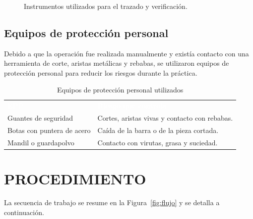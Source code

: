 \documentclass[12pt,a4paper]{article}
\newcommand{\encab}[1]{\textcolor{white}{\sffamily\bfseries #1}}
\begin{document}
\begin{figure}[H]
	\centering
	\caption{Instrumentos utilizados para el trazado y
		verificación.}\label{fig:instrumentos}
\end{figure}

\subsection{Equipos de protección personal}

Debido a que la operación fue realizada manualmente y existía contacto con una
herramienta de corte, aristas metálicas y rebabas, se utilizaron equipos de
protección personal para reducir los riesgos durante la práctica.

\begin{table}[H]
	\centering
	\caption{Equipos de protección personal utilizados}
	\small
	\begin{tabularx}{\linewidth}{
			>{\raggedright\arraybackslash}l
			>{\raggedright\arraybackslash}X
		}
		\rowcolor{darkblue}
		\encab{EPP}                &
		\encab{Riesgo que controla}
		\\
		Guantes de seguridad       &
		Cortes, aristas vivas y contacto con rebabas.
		\\
		Botas con puntera de acero &
		Caída de la barra o de la pieza cortada.
		\\
		Mandil o guardapolvo       &
		Contacto con virutas, grasa y suciedad.
		\\
	\end{tabularx}
\end{table}

\section{PROCEDIMIENTO}

La secuencia de trabajo se resume en la Figura~\ref{fig:flujo} y se detalla a
continuación.
\end{document}
